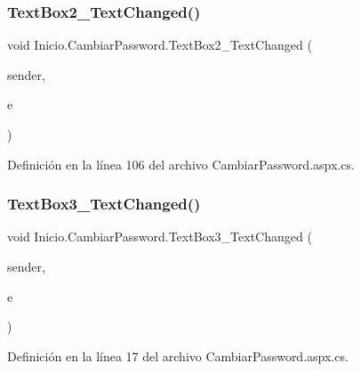 \subsubsection{\texorpdfstring{TextBox2\_TextChanged()}{TextBox2\_TextChanged()}}
{\footnotesize\ttfamily void Inicio.\+Cambiar\+Password.\+Text\+Box2\+\_\+\+Text\+Changed (\begin{DoxyParamCaption}\item[{object}]{sender,  }\item[{Event\+Args}]{e }\end{DoxyParamCaption})\hspace{0.3cm}{\ttfamily [protected]}}



Definición en la línea 106 del archivo Cambiar\+Password.\+aspx.\+cs.


\begin{DoxyCode}{0}

\end{DoxyCode}
\mbox{\label{classInicio_1_1CambiarPassword_a51ae5ea82fb81cd914f095420908a5e4}} 
\subsubsection{\texorpdfstring{TextBox3\_TextChanged()}{TextBox3\_TextChanged()}}
{\footnotesize\ttfamily void Inicio.\+Cambiar\+Password.\+Text\+Box3\+\_\+\+Text\+Changed (\begin{DoxyParamCaption}\item[{object}]{sender,  }\item[{Event\+Args}]{e }\end{DoxyParamCaption})\hspace{0.3cm}{\ttfamily [protected]}}



Definición en la línea 17 del archivo Cambiar\+Password.\+aspx.\+cs.


\begin{DoxyCode}{0}

\end{DoxyCode}


